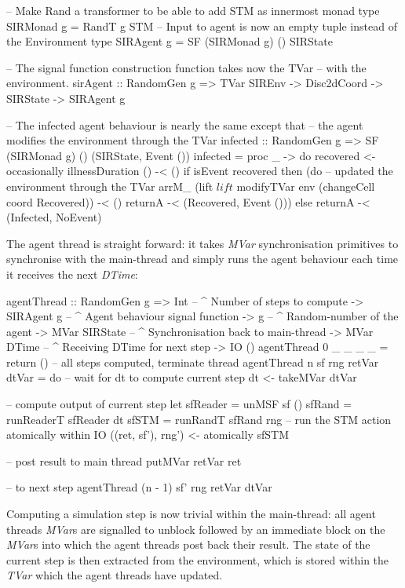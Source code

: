 \begin{HaskellCode}
-- Make Rand a transformer to be able to add STM as innermost monad
type SIRMonad g = RandT g STM
-- Input to agent is now an empty tuple instead of the Environment
type SIRAgent g = SF (SIRMonad g) () SIRState

-- The signal function construction function takes now the TVar
-- with the environment.
sirAgent :: RandomGen g => TVar SIREnv -> Disc2dCoord -> SIRState -> SIRAgent g

-- The infected agent behaviour is nearly the same except that
-- the agent modifies the environment through the TVar
infected :: RandomGen g => SF (SIRMonad g) () (SIRState, Event ())
infected = proc _ -> do
  recovered <- occasionally illnessDuration () -< ()
  if isEvent recovered
    then (do
    	  -- updated the environment through the TVar
      arrM_ (lift $ lift $ modifyTVar env (changeCell coord Recovered)) -< ()
      returnA -< (Recovered, Event ()))
    else returnA -< (Infected, NoEvent)
\end{HaskellCode}

The agent thread is straight forward: it takes \textit{MVar} synchronisation primitives to synchronise with the main-thread and simply runs the agent behaviour each time it receives the next \textit{DTime}:

\begin{HaskellCode}
agentThread :: RandomGen g 
            => Int             -- ^ Number of steps to compute
            -> SIRAgent g      -- ^ Agent behaviour signal function
            -> g               -- ^ Random-number of the agent
            -> MVar SIRState   -- ^ Synchronisation back to main-thread
            -> MVar DTime      -- ^ Receiving DTime for next step
            -> IO ()
agentThread 0 _ _ _ _ = return () -- all steps computed, terminate thread
agentThread n sf rng retVar dtVar = do
  -- wait for dt to compute current step
  dt <- takeMVar dtVar

  -- compute output of current step
  let sfReader = unMSF sf ()
      sfRand   = runReaderT sfReader dt
      sfSTM    = runRandT sfRand rng
  -- run the STM action atomically within IO
  ((ret, sf'), rng') <- atomically sfSTM 

  -- post result to main thread
  putMVar retVar ret
  
  -- to next step
  agentThread (n - 1) sf' rng retVar dtVar
\end{HaskellCode}

Computing a simulation step is now trivial within the main-thread: all agent threads \textit{MVar}s are signalled to unblock followed by an immediate block on the \textit{MVar}s into which the agent threads post back their result. The state of the current step is then extracted from the environment, which is stored within the \textit{TVar} which the agent threads have updated.

